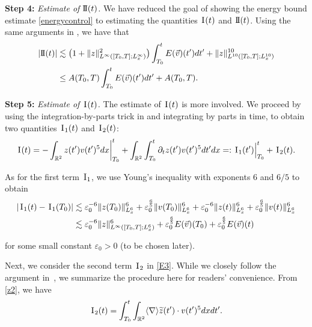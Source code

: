 \documentclass[letterpaper, 11pt,  reqno]{amsart}
\newcommand{\1}{\hspace{0.5mm}\text{I}\hspace{0.2mm}}
\newcommand{\II}{\text{I \hspace{-2.8mm} I} }
\newcommand{\noi}{\noindent}
\newcommand{\R}{\mathbb{R}}
\newcommand{\eps}{\varepsilon}
\newcommand{\wt}{\widetilde}
\newcommand{\dt}{\partial_t}
\newcommand{\les}{\lesssim}
\newcommand{\jb}[1]
{\langle #1 \rangle}
\numberwithin{equation}{section}
\numberwithin{theorem}{section}
\begin{document}
\textbf{Step 4:} \textit{Estimate of $\II(t)$.} We have reduced the goal of showing the energy bound estimate \eqref{energycontrol} to estimating the quantities $\1(t)$ and $\II(t)$. Using the same arguments in \cite{OP}, we have that 
\begin{align}
\begin{split}
|\II(t)| & \les \big(1+ \|z \|^2_{L^\infty([T_0, T];L^\infty_x)} \big)
\int_{T_0}^t E(\vec v)(t') dt' 
+ \|z \|^{10}_{L^{10}([T_0, T]; L^{10}_x )}\\
& \le A(T_0, T)
\int_{T_0}^t E(\vec v)(t') dt' 
+ A(T_0, T).
\end{split}
\label{E2}
\end{align}

\textbf{Step 5:} \textit{Estimate of $\1(t)$.} The estimate of $\1(t)$ is more involved. We proceed by using the integration-by-parts trick in \cite{OP} and integrating by parts in time, to obtain two quantities $\1_1(t)$ and $\1_2(t)$:
\begin{align}
\1(t)  = 
 - \int_{\R^2}  z (t')  v(t') ^5 dx\bigg|_{T_0}^t
+ \int_{\R^2} \int_{T_0}^t \dt z (t')  v(t') ^5dt' dx
=:\1_1(t')\Big|_{T_0}^t +\1_2(t).
\label{E3}
\end{align}


\noi
As for the first term $\1_1$, we use Young's inequality with exponents $6$ and $6/5$ to obtain 
\begin{align}
\begin{split}
|\1_1 (t) - \1_1(T_0)|
& \les \eps_0^{-6}\|z (T_0)\|_{L^6_x}^6  + \eps_0^\frac{6}{5} \|v(T_0)\|^6_{L^6_x} + \eps_0^{-6}\|z (t)\|_{L^6_x}^6  + \eps_0^\frac{6}{5} \|v(t)\|^6_{L^6_x}\\
& \les \eps_0^{-6} \|z\|_{L^\infty([T_0, T];  L^6_x)}^6 
+ \eps_0^\frac{6}{5} E(\vec v)(T_0)
 + \eps_0^\frac{6}{5} E(\vec v)(t)
\end{split}
\label{E4}
\end{align}

\noi
for some small constant $\eps_0 > 0$ (to be chosen later).	


Next, we consider  the  second term $\1_2$ in \eqref{E3}.
While we closely follow the argument in~\cite{OP}, 
we summarize the procedure here for readers' convenience.
From \eqref{z2}, we have 
\begin{equation}
\1_2 (t) =  \int_{T_0}^t 
\int_{\R^2} \jb{\nabla} \wt z (t') \cdot  v(t') ^5 dx dt'.
\label{E4a}
\end{equation}
\end{document}
